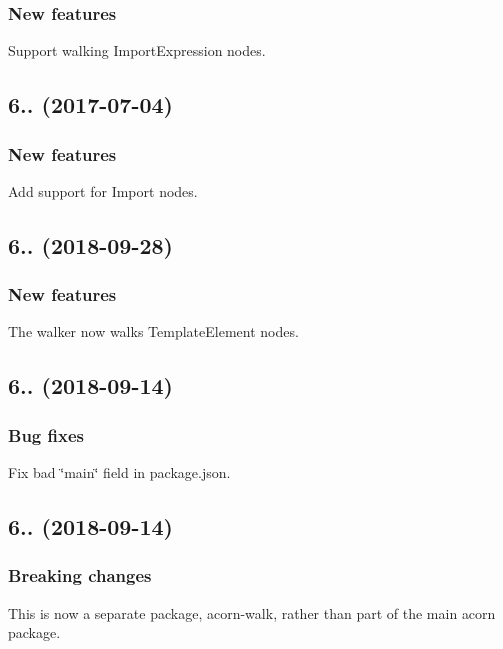 \subsubsection*{New features}

Support walking {\ttfamily Import\+Expression} nodes.

\subsection*{6.. (2017-\/07-\/04)}

\subsubsection*{New features}

Add support for {\ttfamily Import} nodes.

\subsection*{6.. (2018-\/09-\/28)}

\subsubsection*{New features}

The walker now walks {\ttfamily Template\+Element} nodes.

\subsection*{6.. (2018-\/09-\/14)}

\subsubsection*{Bug fixes}

Fix bad \char`\"{}main\char`\"{} field in package.\+json.

\subsection*{6.. (2018-\/09-\/14)}

\subsubsection*{Breaking changes}

This is now a separate package, {\ttfamily acorn-\/walk}, rather than part of the main {\ttfamily acorn} package.

